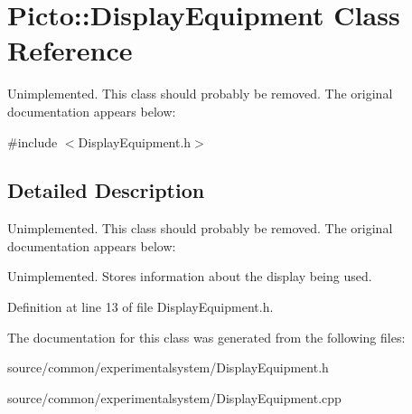 \hypertarget{class_picto_1_1_display_equipment}{\section{Picto\-:\-:Display\-Equipment Class Reference}
\label{class_picto_1_1_display_equipment}
}


Unimplemented. This class should probably be removed. The original documentation appears below\-:  




{\ttfamily \#include $<$Display\-Equipment.\-h$>$}



\subsection{Detailed Description}
Unimplemented. This class should probably be removed. The original documentation appears below\-: 

Unimplemented. Stores information about the display being used. 

Definition at line 13 of file Display\-Equipment.\-h.



The documentation for this class was generated from the following files\-:\begin{DoxyCompactItemize}
\item 
source/common/experimentalsystem/Display\-Equipment.\-h\item 
source/common/experimentalsystem/Display\-Equipment.\-cpp\end{DoxyCompactItemize}
